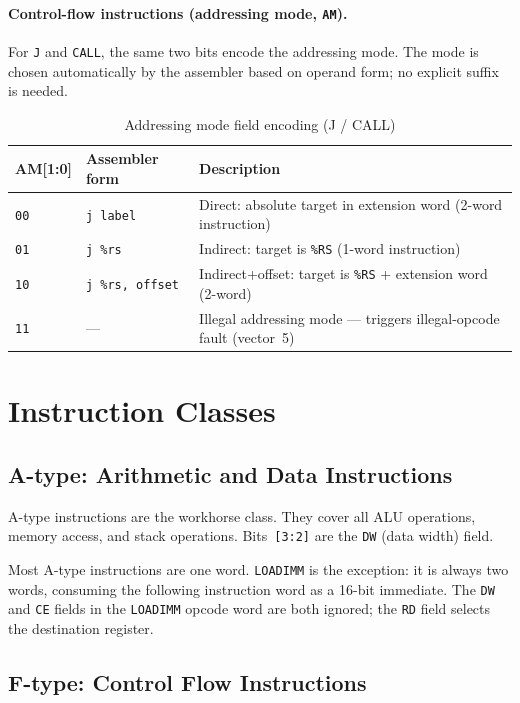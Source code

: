\documentclass[a4paper,12pt]{report}
\newcommand{\asm}[1]{\texttt{#1}}
\newcommand{\field}[1]{\texttt{\small #1}}
\newcommand{\reg}[1]{\texttt{\%#1}}
\begin{document}
\paragraph{Control-flow instructions (addressing mode, \field{AM}).}
For \asm{J} and \asm{CALL}, the same two bits encode the addressing mode. The mode is chosen automatically by the assembler based on operand form; no explicit suffix is needed.

\begin{table}[htbp]
\centering
\caption{Addressing mode field encoding (J / CALL)}
\begin{tabularx}{\textwidth}{llX}
    \toprule
    \textbf{AM[1:0]} & \textbf{Assembler form} & \textbf{Description} \\
    \midrule
    \texttt{00} & \asm{j label}         & Direct: absolute target in extension word (2-word instruction) \\
    \texttt{01} & \asm{j \%rs}          & Indirect: target is \reg{RS} (1-word instruction) \\
    \texttt{10} & \asm{j \%rs, offset}  & Indirect+offset: target is \reg{RS} + extension word (2-word) \\
    \texttt{11} & ---                   & Illegal addressing mode --- triggers illegal-opcode fault (vector~5) \\
    \bottomrule
\end{tabularx}
\end{table}

\section{Instruction Classes}
\label{sec:classes}

\subsection{A-type: Arithmetic and Data Instructions}

A-type instructions are the workhorse class. They cover all ALU operations, memory access, and stack operations. Bits~\field{[3:2]} are the \field{DW} (data width) field.

Most A-type instructions are one word. \asm{LOADIMM} is the exception: it is always two words, consuming the following instruction word as a 16-bit immediate. The \field{DW} and \field{CE} fields in the \asm{LOADIMM} opcode word are both ignored; the \field{RD} field selects the destination register.

\subsection{F-type: Control Flow Instructions}
\end{document}
